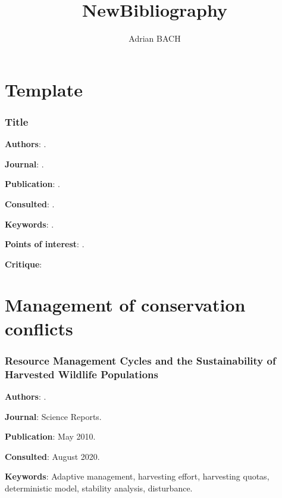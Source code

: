 \documentclass[12pt,a4paper]{article}
\author{Adrian BACH}
\title{NewBibliography}
\begin{document}
\section*{Template}

\subsubsection*{Title}

\textbf{Authors}: \cite{}.

\textbf{Journal}: .

\textbf{Publication}: .

\textbf{Consulted}: .

\textbf{Keywords}: .

\textbf{Points of interest}: .

\textbf{Critique}:

\newpage

\section*{Management of conservation conflicts}

\subsubsection*{Resource Management Cycles and the Sustainability of Harvested Wildlife Populations}

\textbf{Authors}: \cite{fryxell2010resource}.

\textbf{Journal}: Science Reports.

\textbf{Publication}: May 2010.

\textbf{Consulted}: August 2020.

\textbf{Keywords}: Adaptive management, harvesting effort, harvesting quotas, deterministic model, stability analysis, disturbance.
\end{document}

